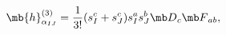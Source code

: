 \begin{equation}
{\mb{h}}_{\alpha_{IJ}}^{(3)}=\frac{1}{3!}(s^{c}_I+s^{c}_J)s_{I}^{a}s^{b}_{J}{\mb D}_{c}{\mb F}_{ab},
\label{3ORDHOL}
\end{equation}

